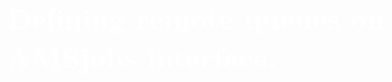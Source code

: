 \section{
    \textcolor{white}{
        Defining remote queues on AMSjobs interface.
    }
    \label{sec3:defq}
}

